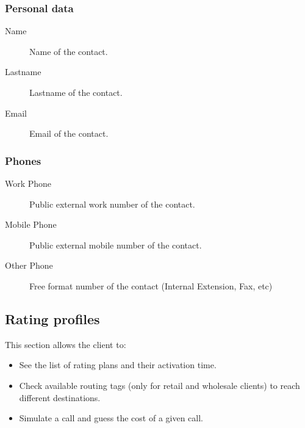 \documentclass[letterpaper,10pt,english]{sphinxmanual}
\begin{document}
\subsubsection{Personal data}
\label{administration_portal/client/vpbx/addressbook:personal-data}\begin{description}
\item[{Name}] \leavevmode{}\label{administration_portal/client/vpbx/addressbook:term-name}
Name of the contact.

\item[{Lastname}] \leavevmode{}\label{administration_portal/client/vpbx/addressbook:term-lastname}
Lastname of the contact.

\item[{Email}] \leavevmode{}\label{administration_portal/client/vpbx/addressbook:term-email}
Email of the contact.

\end{description}


\subsubsection{Phones}
\label{administration_portal/client/vpbx/addressbook:phones}\begin{description}
\item[{Work Phone}] \leavevmode{}\label{administration_portal/client/vpbx/addressbook:term-work-phone}
Public external work number of the contact.

\item[{Mobile Phone}] \leavevmode{}\label{administration_portal/client/vpbx/addressbook:term-mobile-phone}
Public external mobile number of the contact.

\item[{Other Phone}] \leavevmode{}\label{administration_portal/client/vpbx/addressbook:term-other-phone}
Free format number of the contact (Internal Extension, Fax, etc)

\end{description}


\subsection{Rating profiles}
\label{administration_portal/client/vpbx/rating_profiles:rating-profiles}\label{administration_portal/client/vpbx/rating_profiles::doc}
This section allows the client to:
\begin{itemize}
\item {} 
See the list of rating plans and their activation time.

\item {} 
Check available routing tags (only for retail and wholesale clients) to reach different destinations.

\item {} 
Simulate a call and guess the cost of a given call.

\end{itemize}
\end{document}
